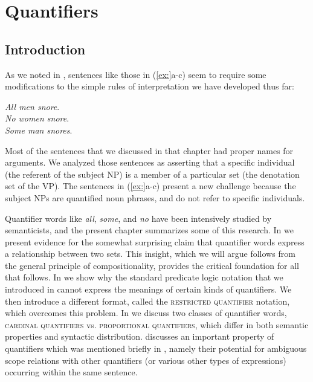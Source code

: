 \chapter{Quantifiers}\label{sec:14}

\section{Introduction}\label{sec:14.1}

As we noted in , sentences like those in (\ref{ex:}a-c) seem to require some modifications to the simple rules of interpretation we have developed thus far:


\ea
\ea \textit{All men snore}.\\
\ex \textit{No women snore}.\\
\ex \textit{Some man snores}.
                       \z
\z


Most of the sentences that we discussed in that chapter had proper names for arguments. We analyzed those sentences as asserting that a specific individual (the referent of the subject NP) is a member of a particular set (the denotation set of the VP). The sentences in (\ref{ex:}a-c) present a new challenge because the subject NPs are quantified noun phrases, and do not refer to specific individuals.



Quantifier words like \textit{all}, \textit{some}, and \textit{no} have been intensively studied by semanticists, and the present chapter summarizes some of this research. In  we present evidence for the somewhat surprising claim that quantifier words express a relationship between two sets. This insight, which we will argue follows from the general principle of compositionality, provides the critical foundation for all that follows. In  we show why the standard predicate logic notation that we introduced in  cannot express the meanings of certain kinds of quantifiers. We then introduce a different format, called the \textsc{restricted quantifier} notation, which overcomes this problem. In  we discuss two classes of quantifier words, \textsc{cardinal quantifiers} vs. \textsc{proportional quantifiers}, which differ in both semantic properties and syntactic distribution.  discusses an important property of quantifiers which was mentioned briefly in , namely their potential for ambiguous scope relations with other quantifiers (or various other types of expressions) occurring within the same sentence.



